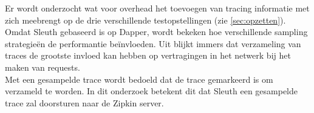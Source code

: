 Er wordt onderzocht wat voor overhead het toevoegen van tracing informatie met zich meebrengt op de drie verschillende testopstellingen (zie \ref{sec:opzetten}). Omdat Sleuth gebaseerd is op Dapper, wordt bekeken hoe verschillende sampling strategieën de performantie beïnvloeden. Uit \autocite{Sigelman2010} blijkt immers dat verzameling van traces de grootste invloed kan hebben op vertragingen in het netwerk bij het maken van requests. \\

Met een gesampelde trace wordt bedoeld dat de trace gemarkeerd is om verzameld te worden. In dit onderzoek betekent dit dat Sleuth een gesampelde trace zal doorsturen naar de Zipkin server. \\


